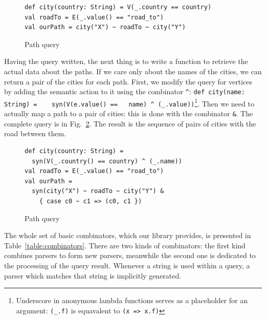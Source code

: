 \begin{figure}[h]
\begin{lstlisting}
def city(country: String) = V(_.country == country)
val roadTo = E(_.value() == "road_to")
val ourPath = city("X") ~ roadTo ~ city("Y")
\end{lstlisting}
\caption{Path query}
\label{fig:simpleQuery}
\end{figure}

Having the query written, the next thing is to write a function to retrieve the actual data about the paths.
If we care only about the names of the cities, we can return a pair of the cities for each path.
First, we modify the query for vertices by adding the semantic action to it using the combinator \lstinline{^}: \lstinline{def city(name: String) =    syn(V(e.value() ==   name) ^ (_.value))}\footnote{Underscore in anonymous lambda functions serves as a placeholder for an argument: \lstinline{(_.f)} is equavalent to \lstinline{(x => x.f)} }.
Then we need to actually map a path to a pair of cities: this is done with the combinator \lstinline{&}.
The complete query is in Fig.~\ref{fig:simpleQueryV2}.
The result is the sequence of pairs of cities with the road between them.

\begin{figure}[h]
\begin{lstlisting}
def city(country: String) =
  syn(V(_.country() == country) ^ (_.name))
val roadTo = E(_.value() == "road_to")
val ourPath =
  syn(city("X") ~ roadTo ~ city("Y") &
    { case c0 ~ c1 => (c0, c1 })
\end{lstlisting}
\caption{Path query}
\label{fig:simpleQueryV2}
\end{figure}


The whole set of basic combinators, which our library provides, is presented in Table~\ref{table:combinators}.
There are two kinds of combinators: the first kind combines parsers to form new parsers, meanwhile the second one is dedicated to the processing of the query result.
Whenever a string is used within a query, a parser which matches that string is implicitly generated.

